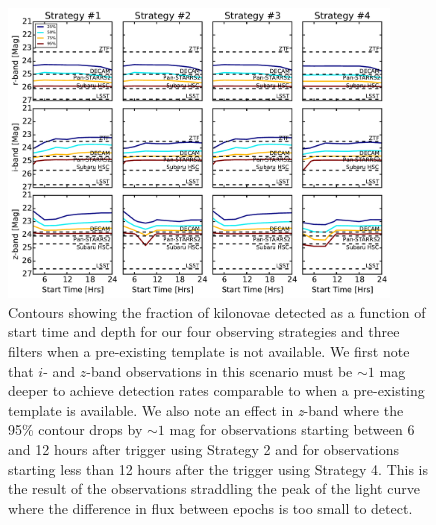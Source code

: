 \begin{figure}[t!]
\centering
\includegraphics[width=0.9\textwidth]{./figs/chapter2/ch2_f12.pdf}
\caption{Contours showing the fraction of kilonovae detected as a function of start time and depth for our four observing strategies and three filters when a pre-existing template is not available. We first note that $i$- and $z$-band observations in this scenario must be $\sim1$ mag deeper to achieve detection rates comparable to when a pre-existing template is available. We also note an effect in {\em z}-band where the 95\% contour drops by $\sim1$ mag for observations starting between 6 and 12 hours after trigger using Strategy 2 and for observations starting less than 12 hours after the trigger using Strategy 4. This is the result of the observations straddling the peak of the light curve where the difference in flux between epochs is too small to detect.}
\label{fig:ch2_detdiff}
\end{figure}


